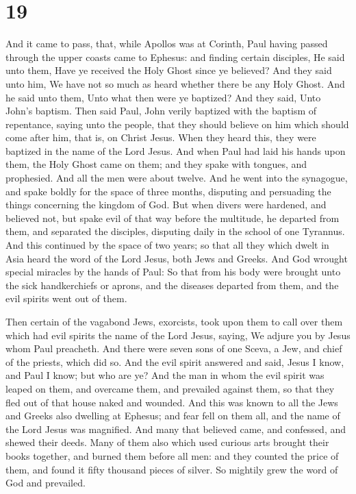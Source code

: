 \hypertarget{section-18}{%
\section{19}\label{section-18}}

 And it came to pass, that, while Apollos was at Corinth,
Paul having passed through the upper coasts came to Ephesus: and finding
certain disciples,  He said unto them, Have ye received the
Holy Ghost since ye believed? And they said unto him, We have not so
much as heard whether there be any Holy Ghost.  And he said
unto them, Unto what then were ye baptized? And they said, Unto John's
baptism.  Then said Paul, John verily baptized with the
baptism of repentance, saying unto the people, that they should believe
on him which should come after him, that is, on Christ Jesus.
 When they heard this, they were baptized in the name of the
Lord Jesus.  And when Paul had laid his hands upon them, the
Holy Ghost came on them; and they spake with tongues, and prophesied.
 And all the men were about twelve.  And he went
into the synagogue, and spake boldly for the space of three months,
disputing and persuading the things concerning the kingdom of God.
 But when divers were hardened, and believed not, but spake
evil of that way before the multitude, he departed from them, and
separated the disciples, disputing daily in the school of one Tyrannus.
 And this continued by the space of two years; so that all
they which dwelt in Asia heard the word of the Lord Jesus, both Jews and
Greeks.  And God wrought special miracles by the hands of
Paul:  So that from his body were brought unto the sick
handkerchiefs or aprons, and the diseases departed from them, and the
evil spirits went out of them.

 Then certain of the vagabond Jews, exorcists, took upon
them to call over them which had evil spirits the name of the Lord
Jesus, saying, We adjure you by Jesus whom Paul preacheth. 
And there were seven sons of one Sceva, a Jew, and chief of the priests,
which did so.  And the evil spirit answered and said, Jesus
I know, and Paul I know; but who are ye?  And the man in
whom the evil spirit was leaped on them, and overcame them, and
prevailed against them, so that they fled out of that house naked and
wounded.  And this was known to all the Jews and Greeks
also dwelling at Ephesus; and fear fell on them all, and the name of the
Lord Jesus was magnified.  And many that believed came, and
confessed, and shewed their deeds.  Many of them also which
used curious arts brought their books together, and burned them before
all men: and they counted the price of them, and found it fifty thousand
pieces of silver.  So mightily grew the word of God and
prevailed.

